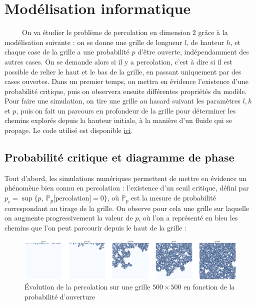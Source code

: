 \documentclass[11pt,a4paper]{article}
\begin{document}
\section{Modélisation informatique}
\ \ \ \ \ On va étudier le problème de percolation en dimension $2$ grâce à la modélisation suivante : on se donne une grille de longueur $l$, de hauteur $h$, et chaque case de la grille a une probabilité $p$ d'être ouverte, indépendamment des autres cases. On se demande alors si il y a percolation, c'est à dire si il est possible de relier le haut et le bas de la grille, en passant uniquement par des cases ouvertes. Dans un premier temps, on mettra en évidence l'existence d'une probabilité critique, puis on observera ensuite différentes propriétés du modèle. \\
Pour faire une simulation, on tire une grille au hasard suivant les paramètres $l,h$ et $p$, puis on fait un parcours en profondeur de la grille pour déterminer les chemins explorés depuis la hauteur initiale, à la manière d'un fluide qui se propage. Le code utilisé est disponible \href{https://github.com/Hazdard}{ici}.

\subsection{Probabilité critique et diagramme de phase}

Tout d'abord, les simulations numériques permettent de mettre en évidence un phénomène bien connu en percolation : l'existence d'un seuil critique, défini par $p_c = \sup{ \{p, \ \mathbb{P}_p[\text{percolation]}=0 \} }$, où $ \mathbb{P}_p$ est la mesure de probabilité correspondant au tirage de la grille. On observe pour cela une grille sur laquelle on augmente progressivement la valeur de $p$, où l'on a représenté en bleu les chemins que l'on peut parcourir depuis le haut de la grille : 

\begin{figure}[htbp]
    \centering
    \includegraphics[width=1 \textwidth]{evolution2.png}
    \caption{Évolution de la percolation sur une grille $500\times 500$ en fonction de la probabilité d'ouverture}
    \label{fig:evol}
\end{figure}
\end{document}
